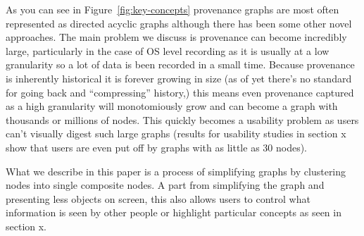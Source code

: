 As you can see in Figure~\ref{fig:key-concepts} provenance graphs are most often represented as directed acyclic graphs
although there has been some other novel approaches. The main problem we discuss is  provenance can become incredibly large, particularly in the case of OS level recording as it is usually at a low granularity so a lot of data is been recorded in a small time. Because provenance is inherently historical it is forever growing in size (as of yet there's no standard for going back and ``compressing'' history,) this means even  provenance captured as a high granularity will monotomiously grow and can become a graph with thousands or millions of nodes. This quickly becomes a
usability problem as users can't visually digest such large graphs (results for usability studies in section x show that users are even put off by graphs with as little as 30 nodes).

What we describe in this paper is a process of simplifying graphs by clustering nodes into single composite nodes. A part from simplifying the graph and presenting less objects on screen, this also allows users to control what information is seen by other people or highlight particular concepts as seen in section x.
